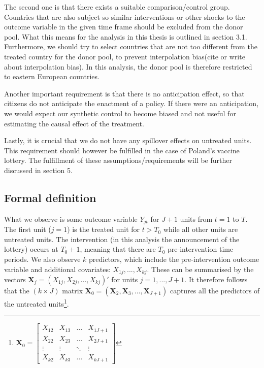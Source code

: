 \documentclass{scrbook}
\begin{document}
The second one is that there exists a suitable comparison/control group.
Countries that are also subject so similar interventions or other shocks
to the outcome variable in the given time frame should be excluded from
the donor pool. What this means for the analysis in this thesis is
outlined in section 3.1. Furthermore, we should try to select countries
that are not too different from the treated country for the donor pool,
to prevent interpolation bias(cite or write about interpolation bias).
In this analysis, the donor pool is therefore restricted to eastern
European countries.

Another important requirement is that there is no anticipation effect,
so that citizens do not anticipate the enactment of a policy. If there
were an anticipation, we would expect our synthetic control to become
biased and not useful for estimating the causal effect of the treatment.

Lastly, it is crucial that we do not have any spillover effects on
untreated units. This requirement should however be fulfilled in the
case of Poland's vaccine lottery. The fulfillment of these
assumptions/requirements will be further discussed in section 5.

\subsection*{Formal definition}

What we observe is some outcome variable \(Y_{jt}\) for \(J + 1\) units
from \(t=1\) to \(T\). The first unit (\(j = 1\)) is the treated unit
for \(t>T_{0}\) while all other units are untreated units. The
intervention (in this analysis the announcement of the lottery) occurs
at \(T_{0}+1\), meaning that there are \(T_{0}\) pre-intervention time
periods. We also observe \(k\) predictors, which include the
pre-intervention outcome variable and additional covariates:
\(X_{1j},...,X_{kj}\). These can be summarised by the vectors
\(\mathbf{X}_{j}=(X_{1j},X_{2j},...,X_{kj})'\) for units
\(j=1,...,J + 1\). It therefore follows that the \((k\times J)\) matrix
\(\mathbf{X}_{0}=(\mathbf{X}_{2},\mathbf{X}_{3},...,\mathbf{X}_{J + 1})\)
captures all the predictors of the untreated
units\footnote{\(\mathbf{X}_0=
\begin{bmatrix}
X_{12} & X_{13} & \dots & X_{1J+1}\\
X_{22} & X_{23} & \dots & X_{2J+1}\\
\vdots & \vdots & \ddots & \vdots\\
X_{k2} & X_{k3} & \dots & X_{kJ + 1}
\end{bmatrix}\)}.
\end{document}
